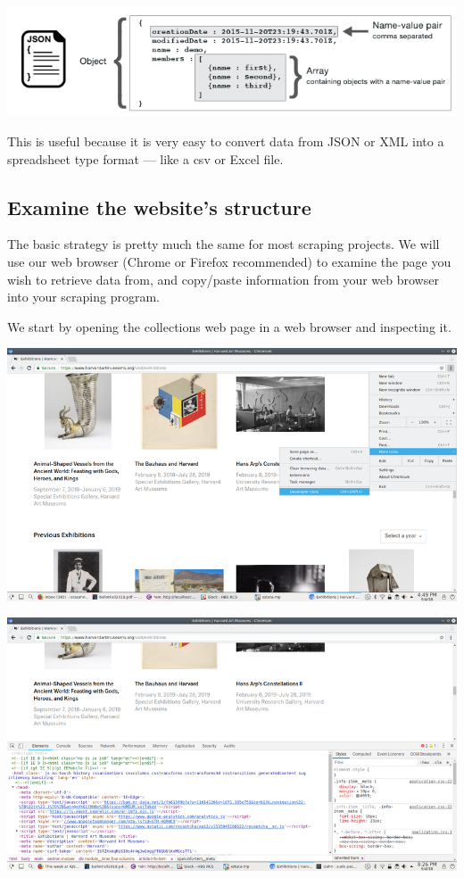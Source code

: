 \documentclass[
]{book}
\begin{document}
\includegraphics{Python/PythonWebScrape/images/json-format.png}

This is useful because it is very easy to convert data from JSON or XML into a spreadsheet type format --- like a csv or Excel file.

\hypertarget{examine-the-websites-structure}{%
\subsection{Examine the website's structure}\label{examine-the-websites-structure}}

The basic strategy is pretty much the same for most scraping projects. We will use our web browser (Chrome or Firefox recommended) to examine the page you wish to retrieve data from, and copy/paste information from your web browser into your scraping program.

We start by opening the collections web page in a web browser and inspecting it.

\includegraphics{Python/PythonWebScrape/images/dev_tools.png}

\includegraphics{Python/PythonWebScrape/images/dev_tools_pane.png}
\end{document}
